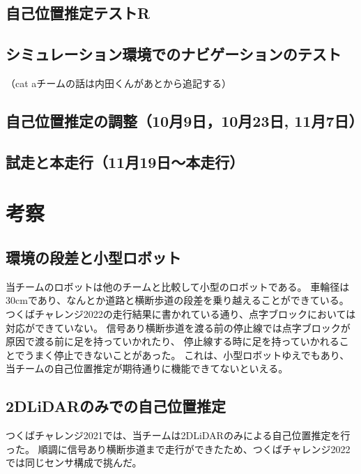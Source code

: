 \documentclass[twocolumn,9pt]{jsproceedings}
\begin{document}
\subsection{自己位置推定テストR}

\subsection{シミュレーション環境でのナビゲーションのテスト}

（cat aチームの話は内田くんがあとから追記する）
\subsection{自己位置推定の調整（10月9日，10月23日, 11月7日）}


\subsection{試走と本走行（11月19日〜本走行）}


\section{考察}

\subsection{環境の段差と小型ロボット}

当チームのロボットは他のチームと比較して小型のロボットである。
車輪径は30cmであり、なんとか道路と横断歩道の段差を乗り越えることができている。
つくばチャレンジ2022の走行結果に書かれている通り、点字ブロックにおいては対応ができていない。
信号あり横断歩道を渡る前の停止線では点字ブロックが原因で渡る前に足を持っていかれたり、
停止線する時に足を持っていかれることでうまく停止できないことがあった。
これは、小型ロボットゆえでもあり、当チームの自己位置推定が期待通りに機能できてないといえる。

\subsection{2DLiDARのみでの自己位置推定}

つくばチャレンジ2021では、当チームは2DLiDARのみによる自己位置推定を行った\cite{RTshop}。
順調に信号あり横断歩道まで走行ができたため、つくばチャレンジ2022では同じセンサ構成で挑んだ。
\end{document}
